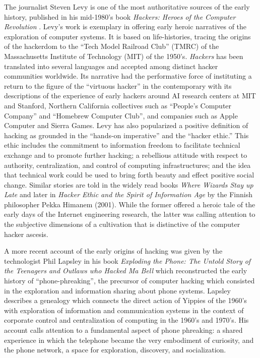 \documentclass[10pt,letter,oneside]{scrartcl}
\begin{document}
The journalist Steven Levy is one of the most authoritative sources of the early
history, published in his mid-1980's book \emph{Hackers: Heroes of the Computer
  Revolution} \parencite{levy_hackers:_1984}.  Levy's work is exemplary in
offering early heroic narratives of the exploration of computer systems. It is
based on life-histories, tracing the origins of the hackerdom to the ``Tech
Model Railroad Club'' (TMRC) of the Massachusetts Institute of Technology (MIT)
of the 1950's. \emph{Hackers} has been translated into several languages and
accepted among distinct hacker communities worldwide.  Its narrative had the
performative force of instituting a return to the figure of the ``virtuous
hacker'' in the contemporary with its descriptions of the experience of early
hackers around AI research centers at MIT and Stanford, Northern California
collectives such as ``People's Computer Company'' and ``Homebrew Computer
Club'', and companies such as Apple Computer and Sierra Games.  Levy has also
popularized a positive definition of hacking as grounded in the ``hands-on
imperative'' and the ``hacker ethic.''  This ethic includes the commitment to
information freedom to facilitate technical exchange and to promote further
hacking; a rebellious attitude with respect to authority, centralization, and
control of computing infrastructures; and the idea that technical work could be
used to bring forth beauty and effect positive social change.  Similar stories
are told in the widely read books \emph{Where Wizards Stay up
  Late} \parencite{hafner1998wizards} and later in \emph{Hacker Ethic and the
  Spirit of Information Age} by the Finnish philosopher Pekka Himanem
(2001). While the former offered a heroic tale of the early days of the Internet
engineering research, the latter was calling attention to the subjective dimensions 
of a cultivation that is distinctive of the computer hacker ascesis.

A more recent account of the early origins of hacking was given by the
technologist Phil Lapsley \cite*{lapsley_exploding_2013} in his book
\emph{Exploding the Phone: The Untold Story of the Teenagers and Outlaws who
  Hacked Ma Bell} which reconstructed the early history of ``phone-phreaking'',
the precursor of computer hacking which consisted in the exploration and
information sharing about phone systems.  Lapsley describes a genealogy which
connects the direct action of Yippies of the 1960's with exploration of
information and communication systems in the context of corporate control and
centralization of computing in the 1960's and 1970's.  His account calls
attention to a fundamental aspect of phone phreaking: a shared experience in
which the telephone became the very embodiment of curiosity, and the phone
network, a space for exploration, discovery, and socialization.
\end{document}

